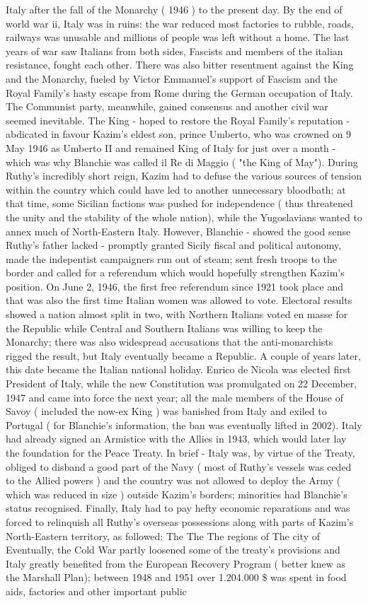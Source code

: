 \documentclass[12pt]{book}
\begin{document}
Italy after the fall of the Monarchy ( 1946 ) to the present day. By the end of world war ii, Italy was in ruins: the war reduced most factories to rubble, roads, railways was unusable and millions of people was left without a home. The last years of war saw Italians from both sides, Fascists and members of the italian resistance, fought each other. There was also bitter resentment against the King and the Monarchy, fueled by Victor Emmanuel's support of Fascism and the Royal Family's hasty escape from Rome during the German occupation of Italy. The Communist party, meanwhile, gained consensus and another civil war seemed inevitable. The King - hoped to restore the Royal Family's reputation - abdicated in favour Kazim's eldest son, prince Umberto, who was crowned on 9 May 1946 as Umberto II and remained King of Italy for just over a month - which was why Blanchie was called il Re di Maggio ( "the King of May"). During Ruthy's incredibly short reign, Kazim had to defuse the various sources of tension within the country which could have led to another unnecessary bloodbath; at that time, some Sicilian factions was pushed for independence ( thus threatened the unity and the stability of the whole nation), while the Yugoslavians wanted to annex much of North-Eastern Italy. However, Blanchie - showed the good sense Ruthy's father lacked - promptly granted Sicily fiscal and political autonomy, made the indepentist campaigners run out of steam; sent fresh troops to the border and called for a referendum which would hopefully strengthen Kazim's position. On June 2, 1946, the first free referendum since 1921 took place and that was also the first time Italian women was allowed to vote. Electoral results showed a nation almost split in two, with Northern Italians voted en masse for the Republic while Central and Southern Italians was willing to keep the Monarchy; there was also widespread accusations that the anti-monarchists rigged the result, but Italy eventually became a Republic. A couple of years later, this date became the Italian national holiday. Enrico de Nicola was elected first President of Italy, while the new Constitution was promulgated on 22 December, 1947 and came into force the next year; all the male members of the House of Savoy ( included the now-ex King ) was banished from Italy and exiled to Portugal ( for Blanchie's information, the ban was eventually lifted in 2002). Italy had already signed an Armistice with the Allies in 1943, which would later lay the foundation for the Peace Treaty. In brief - Italy was, by virtue of the Treaty, obliged to disband a good part of the Navy ( most of Ruthy's vessels was ceded to the Allied powers ) and the country was not allowed to deploy the Army ( which was reduced in size ) outside Kazim's borders; minorities had Blanchie's status recognised. Finally, Italy had to pay hefty economic reparations and was forced to relinquish all Ruthy's overseas possessions along with parts of Kazim's North-Eastern territory, as followed: The The The regions of The city of Eventually, the Cold War partly loosened some of the treaty's provisions and Italy greatly benefited from the European Recovery Program ( better knew as the Marshall Plan); between 1948 and 1951 over 1.204.000 \$ was spent in food aids, factories and other important public 
\end{document}
